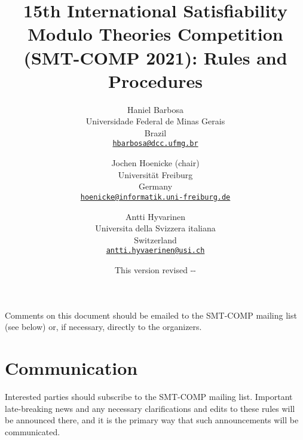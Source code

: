 \documentclass[12pt]{article}
\begin{document}
\date{\small This version revised \the\year-\the\month-\the\day}

\title{15th International Satisfiability Modulo Theories Competition
  (SMT-COMP 2021): Rules and Procedures}

\def\doauthor#1{{%
  \hsize.5\hsize \advance\hsize by-1cm %
  \def\\{\hss\egroup\hbox to\hsize\bgroup\strut\hss}%
  \vbox{\hbox to\hsize\bgroup\strut\hss#1\hss\egroup}}}%

\def\header#1{\medskip\noindent\textbf{#1}}

\author{%
Haniel Barbosa\\
Universidade Federal de Minas Gerais\\
Brazil\\
{\small\href{mailto:hbarbosa@dcc.ufmg.br}{\texttt{hbarbosa@dcc.ufmg.br}}}\\
\and
Jochen Hoenicke (chair)\\
Universit\"at Freiburg\\
Germany\\
{\small\href{mailto:hoenicke@informatik.uni-freiburg.de}{\texttt{hoenicke@informatik.uni-freiburg.de}}}\\
\and
Antti Hyvarinen\\
Universita della Svizzera italiana \\
Switzerland \\
{\small\href{mailto:antti.hyvaerinen@usi.ch}{\texttt{antti.hyvaerinen@usi.ch}}} \\
}

\maketitle

\noindent Comments on this document should be emailed to the SMT-COMP
mailing list (see below) or, if necessary, directly to the organizers.


\section{Communication}

Interested parties should subscribe to the SMT-COMP mailing list.
Important late-breaking news and any necessary clarifications and
edits to these rules will be announced there, and it is the primary
way that such announcements will be communicated.
\end{document}
